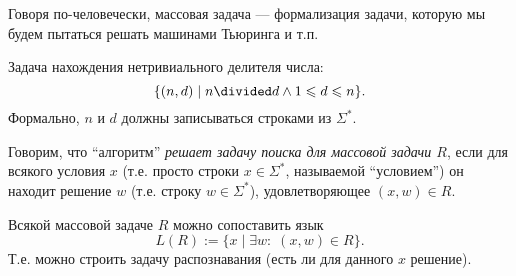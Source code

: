 \documentclass[12pt,a4paper]{article}
\begin{document}
    \begin{remark*}
        Говоря по-человечески, массовая задача --- формализация задачи, которую мы будем пытаться решать машинами Тьюринга и т.п.
    \end{remark*}

    \begin{example}
        Задача нахождения нетривиального делителя числа:
        \[\{(n, d) \mid n \divided d \wedge 1 \leqslant d \leqslant n\}.\]
        Формально, $n$ и $d$ должны записываться строками из $\Sigma^*$.
    \end{example}

    \begin{definition}
        Говорим, что ``алгоритм'' \emph{решает задачу поиска для массовой задачи $R$}, если для всякого условия $x$ (т.е. просто строки $x \in \Sigma^*$, называемой ``условием'') он находит решение $w$ (т.е. строку $w \in \Sigma^*$), удовлетворяющее $(x, w) \in R$.
    \end{definition}

    \begin{definition}
        Всякой массовой задаче $R$ можно сопоставить язык
        \[L(R) := \{x \mid \exists w \colon \; (x, w) \in R\}.\]
        Т.е. можно строить задачу распознавания (есть ли для данного $x$ решение).
    \end{definition}
\end{document}
